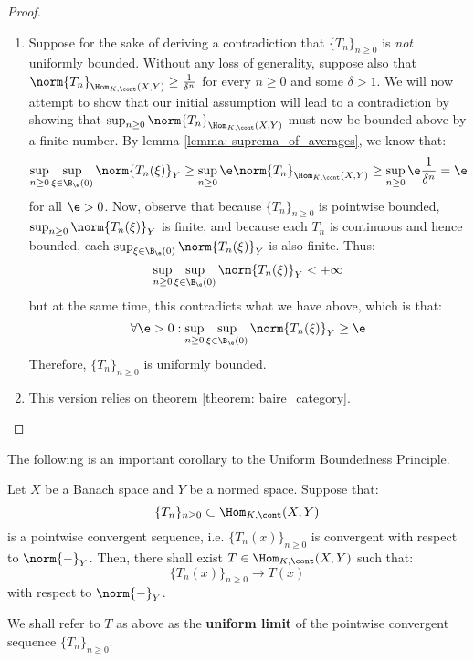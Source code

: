             \begin{proof}
                \begin{enumerate}
                    \item Suppose for the sake of deriving a contradiction that $\{T_n\}_{n \geq 0}$ is \textit{not} uniformly bounded. Without any loss of generality, suppose also that $\norm{T_n}_{\Hom_{K, \cont}(X, Y)} \geq \frac{1}{\delta^n}$ for every $n \geq 0$ and some $\delta > 1$. We will now attempt to show that our initial assumption will lead to a contradiction by showing that $\sup_{n \geq 0} \norm{T_n}_{\Hom_{K, \cont}(X, Y)}$ must now be bounded above by a finite number. By lemma \ref{lemma: suprema_of_averages}, we know that:
                        $$\sup_{n \geq 0} \sup_{\xi \in \B_{\e}(0)} \norm{T_n(\xi)}_Y \geq \sup_{n \geq 0} \e \norm{T_n}_{\Hom_{K, \cont}(X, Y)} \geq \sup_{n \geq 0} \e \frac{1}{\delta^n} = \e$$
                    for all $\e > 0$. Now, observe that because $\{T_n\}_{n \geq 0}$ is pointwise bounded, $\sup_{n \geq 0} \norm{T_n(\xi)}_Y$ is finite, and because each $T_n$ is continuous and hence bounded, each $\sup_{\xi \in \B_{\e}(0)} \norm{T_n(\xi)}_Y$ is also finite. Thus:
                        $$\sup_{n \geq 0} \sup_{\xi \in \B_{\e}(0)} \norm{T_n(\xi)}_Y < +\infty$$
                    but at the same time, this contradicts what we have above, which is that:
                        $$\forall \e > 0: \sup_{n \geq 0} \sup_{\xi \in \B_{\e}(0)} \norm{T_n(\xi)}_Y \geq \e$$
                    Therefore, $\{T_n\}_{n \geq 0}$ is uniformly bounded.
                    \item This version relies on theorem \ref{theorem: baire_category}. 
                \end{enumerate}
            \end{proof}
        The following is an important corollary to the Uniform Boundedness Principle.
        \begin{corollary} \label{coro: uniform_limits_of_pointwise_convergent_sequences_of_continuous_linear_maps}
            Let $X$ be a Banach space and $Y$ be a normed space. Suppose that:
                $$\{T_n\}_{n \geq 0} \subset \Hom_{K, \cont}(X, Y)$$
            is a pointwise convergent sequence, i.e. $\{T_n(x)\}_{n \geq 0}$ is convergent with respect to $\norm{-}_Y$. Then, there shall exist $T \in \Hom_{K, \cont}(X, Y)$ such that:
                $$\{T_n(x)\}_{n \geq 0} \to T(x)$$
            with respect to $\norm{-}_Y$.

            We shall refer to $T$ as above as the \textbf{uniform limit} of the pointwise convergent sequence $\{T_n\}_{n \geq 0}$.
        \end{corollary}
